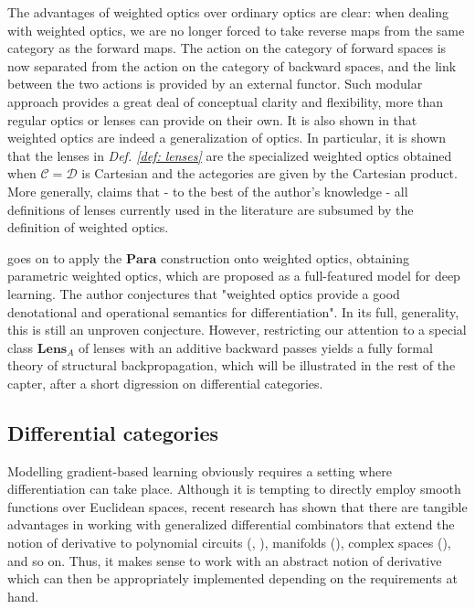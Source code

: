 \documentclass[11pt,a4paper,openright,twoside]{report}
\theoremstyle{plain}
\theoremstyle{definition}
\begin{document}
The advantages of weighted optics over ordinary optics are clear: when dealing with weighted optics, we are no longer forced to take reverse maps from the same category as the forward maps. The action on the category of forward spaces is now separated from the action on the category of backward spaces, and the link between the two actions is provided by an external functor. Such modular approach provides a great deal of conceptual clarity and flexibility, more than regular optics or lenses can provide on their own. It is also shown in \cite{gavranovic2024fundamental} that weighted optics are indeed a generalization of optics. In particular, it is shown that the lenses in \textit{Def. \ref{def: lenses}} are the specialized weighted optics obtained when $\mathcal{C} = \mathcal{D}$ is Cartesian and the actegories are given by the Cartesian product. More generally, \cite{gavranovic2024fundamental} claims that - to the best of the author's knowledge - all definitions of lenses currently used in the literature are subsumed by the definition of weighted optics.


\cite{gavranovic2024fundamental} goes on to apply the $\mathbf{Para}$ construction onto weighted optics, obtaining parametric weighted optics, which are proposed as a full-featured model for deep learning. The author conjectures that "weighted optics provide a good denotational and operational semantics for differentiation". In its full, generality, this is still an unproven conjecture. However, restricting our attention to a special class $\mathbf{Lens}_A$ of lenses with an additive backward passes yields a fully formal theory of structural backpropagation, which will be illustrated in the rest of the capter, after a short digression on differential categories.





\subsection{Differential categories}
\label{subsec: diffcats}


Modelling gradient-based learning obviously requires a setting where differentiation can take place. Although it is tempting to directly employ smooth functions over Euclidean spaces, recent research has shown that there are tangible advantages in working with generalized differential combinators that extend the notion of derivative to polynomial circuits (\cite{wilson2022categories}, \cite{wilson2021reverse}), manifolds (\cite{peng2021hyperbolic}), complex spaces (\cite{bassey2021survey}), and so on.  Thus, it makes sense to work with an abstract notion of derivative which can then be appropriately implemented depending on the requirements at hand.
\end{document}
